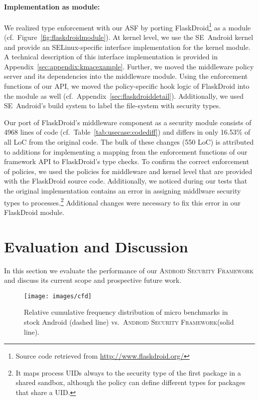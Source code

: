 \documentclass[letterpaper,twocolumn,10pt]{article}
\newcommand{\OURNAME}{\textsc{Android Security Framework}\xspace}
\newcommand{\OURSHORT}{\textsc{ASF}\xspace}
\begin{document}
\paragraph{Implementation as module:} We realized type enforcement with our \OURSHORT by porting FlaskDroid\footnote{Source code retrieved from \url{http://www.flaskdroid.org/}} as a module (cf.~Figure~\ref{fig:flaskdroidmodule}). At kernel level, we use the SE~Android kernel and provide an SELinux-specific interface implementation for the kernel module. A technical description of this interface implementation is provided in Appendix~\ref{sec:appendix:kmacexample}. Further, we moved the middleware policy server and its dependencies into the middleware module. Using the enforcement functions of our API, we moved the policy-specific hook logic of FlaskDroid into the module as well (cf.~Appendix~\ref{sec:flaskdroiddetail}). Additionally, we used SE~Android's build system to label the file-system with security types.

Our port of FlaskDroid's middleware component as a security module consists of 4968 lines of code (cf.~Table~\ref{tab:usecase:codediff}) and differs in only 16.53\% of all LoC from the original code. The bulk of these changes (550 LoC) is attributed to additions for implementing a mapping from the enforcement functions of our framework API to FlaskDroid's type checks. To confirm the correct enforcement of policies, we used the policies for middleware and kernel level that are provided with the FlaskDroid source code. Additionally, we noticed during our tests that the original implementation contains an error in assigning middlware security types to processes.\footnote{It maps process UIDs always to the security type of the first package in a shared sandbox, although the policy can define different types for packages that share a UID.} Additional changes were necessary to fix this error in our FlaskDroid module.
 
\section{Evaluation and Discussion}
\label{sec:eval}
In this section we evaluate the performance of our \OURNAME and discuss its current scope and prospective future work.


\begin{figure}[t]
  \centering
  \texttt{[image: images/cfd]}
  \caption{Relative cumulative frequency distribution of micro benchmarks in stock Android (dashed line) vs.~\OURNAME (solid line).}
  \label{fig:eval:cumulative}
\end{figure}
\end{document}
